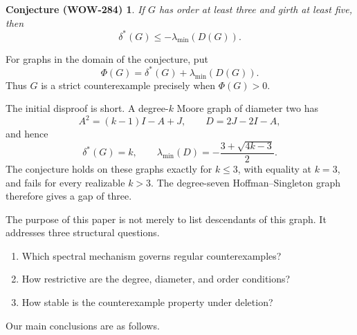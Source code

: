 \documentclass[a4paper,10pt,reqno]{amsart}
\theoremstyle{plain}
\newtheorem*{wowconjecture}{Conjecture (WOW-284)}
\theoremstyle{definition}
\theoremstyle{remark}
\begin{document}
\begin{wowconjecture}\label{conj:wow284}
If \(G\) has order at least three and girth at least five, then
\[
 \delta^*(G)\le-\lambda_{\min}(D(G)).
\]
\end{wowconjecture}

For graphs in the domain of the conjecture, put
\[
 \Phi(G)=\delta^*(G)+\lambda_{\min}(D(G)).
\]
Thus \(G\) is a strict counterexample precisely when \(\Phi(G)>0\).

The initial disproof is short.  A degree-\(k\) Moore graph of diameter two has
\[
 A^2=(k-1)I-A+J,
 \qquad
 D=2J-2I-A,
\]
and hence
\[
 \delta^*(G)=k,
 \qquad
 \lambda_{\min}(D)=-\frac{3+\sqrt{4k-3}}2.
\]
The conjecture holds on these graphs exactly for \(k\le3\), with equality at
\(k=3\), and fails for every realizable \(k>3\).  The degree-seven
Hoffman--Singleton graph therefore gives a gap of three.

The purpose of this paper is not merely to list descendants of this graph.  It
addresses three structural questions.

\begin{enumerate}
\item Which spectral mechanism governs regular counterexamples?
\item How restrictive are the degree, diameter, and order conditions?
\item How stable is the counterexample property under deletion?
\end{enumerate}

Our main conclusions are as follows.
\end{document}

